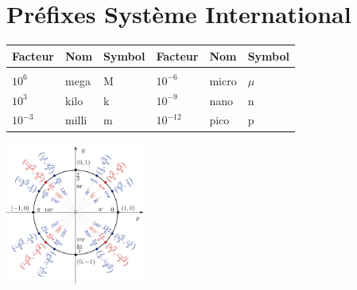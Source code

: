 
\section*{Préfixes Système International}
\begin{center}

\begin{tabular}{lll|lll}
Facteur    & Nom   & Symbol & Facteur    & Nom   & Symbol \\\hline\\[-1em]
$10^{6}$   & mega  & M & $10^{-6}$  & micro & $\mu$ \\
$10^3$     & kilo  & k & $10^{-9}$  & nano  & n     \\
$10^{-3}$  & milli & m & $10^{-12}$ & pico  & p
\end{tabular}

\end{center}

\begin{center}
    \includegraphics[width=0.35\textwidth]{fig/unit_circle.png}    
\end{center}
